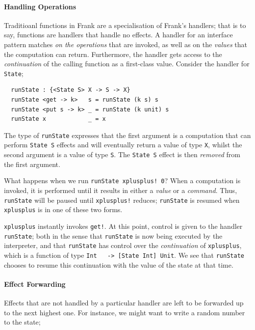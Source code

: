 \documentclass[msc,deptreport,cs]{infthesis} %
\newcommand{\code}[1]{\lstinline{#1}}
\begin{document}
\paragraph*{Handling Operations}

Traditioanl functions in Frank are a specialisation of Frank's handlers; that is
to say, functions are handlers that handle no effects. A handler for an
interface pattern matches \emph{on the operations} that are invoked, as well as
on the \emph{values} that the computation can return. Furthermore, the handler
gets access to the \emph{continuation} of the calling function as a first-class
value. Consider the handler for \code{State};

\begin{lstlisting}
  runState : {<State S> X -> S -> X}
  runState <get -> k>   s = runState (k s) s
  runState <put s -> k> _ = runState (k unit) s
  runState x            _ = x
\end{lstlisting}

\noindent The type of \code{runState} expresses that the first argument is a
computation that can perform \code{State S} effects and will eventually return a
value of type \code{X}, whilst the second argument is a value of type \code{S}.
The \code{State S} effect is then \emph{removed} from the first argument.

What happens when we run \code{runState xplusplus! 0}? When a computation is
invoked, it is performed until it results in either a \emph{value} or a
\emph{command}. Thus, \code{runState} will be paused until \code{xplusplus!}
reduces; \code{runState} is resumed when \code{xplusplus} is in one of these two
forms.

\code{xplusplus} instantly invokes \code{get!}. At this point, control is given
to the handler \code{runState}; both in the sense that \code{runState} is now
being executed by the interpreter, and that \code{runState} has control over the
\emph{continuation} of \code{xplusplus}, which is a function of type \code{Int
  -> [State Int] Unit}. We see that \code{runState} chooses to resume this
continuation with the value of the state at that time.

\paragraph*{Effect Forwarding}

Effects that are not handled by a particular handler are left to be forwarded up
to the next highest one. For instance, we might want to write a random number to
the state;
\end{document}
